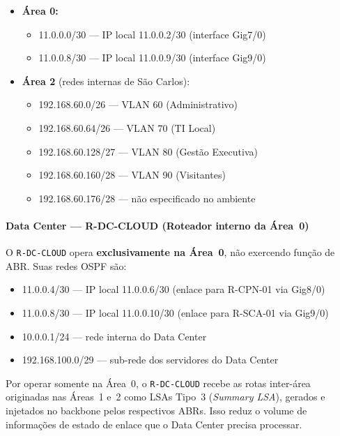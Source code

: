 \documentclass[12pt,a4paper]{article}
\begin{document}
\begin{itemize}
    \item \textbf{Área 0:}
    \begin{itemize}
        \item 11.0.0.0/30 — IP local 11.0.0.2/30 (interface Gig7/0)
        \item 11.0.0.8/30 — IP local 11.0.0.9/30 (interface Gig9/0)
    \end{itemize}
    \item \textbf{Área 2} (redes internas de São Carlos):
    \begin{itemize}
        \item 192.168.60.0/26 — VLAN 60 (Administrativo)
        \item 192.168.60.64/26 — VLAN 70 (TI Local)
        \item 192.168.60.128/27 — VLAN 80 (Gestão Executiva)
        \item 192.168.60.160/28 — VLAN 90 (Visitantes)
        \item 192.168.60.176/28 — não especificado no ambiente
    \end{itemize}
\end{itemize}

\paragraph{Data Center — R-DC-CLOUD (Roteador interno da Área~0)}

O \texttt{R-DC-CLOUD} opera \textbf{exclusivamente na Área~0}, não exercendo função
de ABR. Suas redes OSPF são:

\begin{itemize}
    \item 11.0.0.4/30 — IP local 11.0.0.6/30 (enlace para R-CPN-01 via Gig8/0)
    \item 11.0.0.8/30 — IP local 11.0.0.10/30 (enlace para R-SCA-01 via Gig9/0)
    \item 10.0.0.1/24 — rede interna do Data Center
    \item 192.168.100.0/29 — sub-rede dos servidores do Data Center
\end{itemize}

Por operar somente na Área~0, o \texttt{R-DC-CLOUD} recebe as rotas inter-área
originadas nas Áreas~1 e~2 como LSAs Tipo~3 (\textit{Summary LSA}), gerados e
injetados no backbone pelos respectivos ABRs. Isso reduz o volume de informações de
estado de enlace que o Data Center precisa processar.
\end{document}
